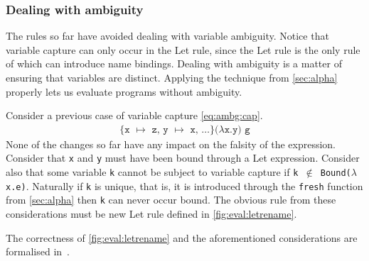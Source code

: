 \subsubsection{Dealing with ambiguity}
The rules so far have avoided dealing with variable ambiguity.
Notice that variable capture can only occur in the Let rule, since the Let rule is the only rule of which can introduce name bindings.
Dealing with ambiguity is a matter of ensuring that variables are distinct.
Applying the technique from \autoref{sec:alpha} properly lets us evaluate programs without ambiguity.

Consider a previous case of variable capture \autoref{eq:ambg:cap}.
\begin{align}
  \texttt{\{x $\mapsto$ z, y $\mapsto$ x, $\dots$\}($\lambda$x.y) g}\label{eq:ambg:cap}
\end{align}
None of the changes so far have any impact on the falsity of the expression.
Consider that \texttt{x} and \texttt{y} must have been bound through a Let expression.
Consider also that some variable \texttt{k} cannot be subject to variable capture if \texttt{k $\notin$ Bound($\lambda$x.e)}.
Naturally if \texttt{k} is unique, that is, it is introduced through the \texttt{fresh} function from \autoref{sec:alpha} then \texttt{k} can never occur bound.
The obvious rule from these considerations must be new Let rule defined in \autoref{fig:eval:letrename}.
\begin{figure}[ht]
  \begin{mdframed}
    \begin{prooftree}
    \end{prooftree}   
  \end{mdframed}
  \caption{}
  \label{fig:eval:letrename}
\end{figure}
The correctness of \autoref{fig:eval:letrename} and the aforementioned considerations are formalised in~\cite{sestoft1997deriving}.

